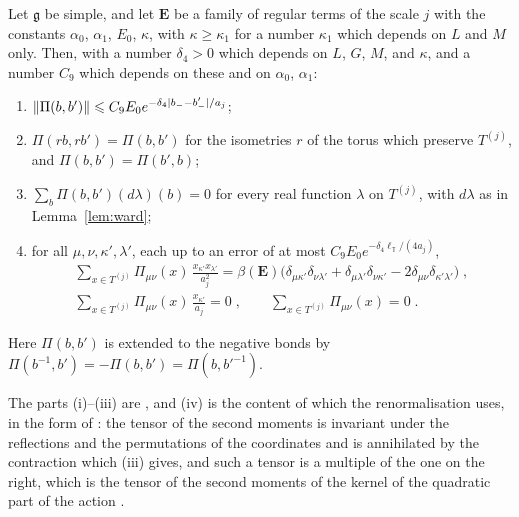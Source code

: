 \documentclass[11pt]{preprint}
\DeclarePairedDelimiter{\abs}{\lvert}{\rvert}
\DeclarePairedDelimiter{\norm}{\lVert}{\rVert}
\numberwithin{equation}{section}
\begin{document}
\begin{proposition}\label{prop:polarisation}
Let $\mathfrak g$ be simple, and let $\mathbf E$ be a family of regular terms of the scale $j$ with the constants $\alpha_0$, $\alpha_1$, $E_0$, $\kappa$, with $\kappa \geqslant \kappa_1$ for a number $\kappa_1$ which depends on $L$ and $M$ only. Then, with a number $\delta_4 > 0$ which depends on $L$, $G$, $M$, and $\kappa$, and a number $C_9$ which depends on these and on $\alpha_0$, $\alpha_1$:
\begin{enumerate}[label=(\roman*)]
\item $\norm{\Pi(b, b')} \leqslant C_9E_0e^{-\delta_4\abs{b_- - b'_-}/a_j}$;
\item $\Pi(rb, rb') = \Pi(b, b')$ for the isometries $r$ of the torus which preserve $T^{(j)}$, and $\Pi(b, b') = \Pi(b', b)$;
\item $\sum_b\Pi(b, b')(d\lambda)(b) = 0$ for every real function $\lambda$ on $T^{(j)}$, with $d\lambda$ as in Lemma~\ref{lem:ward};
\item for all $\mu, \nu, \kappa', \lambda'$, each up to an error of at most $C_9E_0e^{-\delta_4\ell_{\mathbb T}/(4a_j)}$,
\begin{equation}\label{eq:polarisation-moments}
\begin{gathered}
    \sum_{x \in T^{(j)}}\Pi_{\mu\nu}(x)\,\frac{x_{\kappa'}x_{\lambda'}}{a_j^2} = \beta(\mathbf E)\bigl(\delta_{\mu\kappa'}\delta_{\nu\lambda'} + \delta_{\mu\lambda'}\delta_{\nu\kappa'} - 2\delta_{\mu\nu}\delta_{\kappa'\lambda'}\bigr)\;,\\
    \sum_{x \in T^{(j)}}\Pi_{\mu\nu}(x)\,\frac{x_{\kappa'}}{a_j} = 0\;,
    \qquad
    \sum_{x \in T^{(j)}}\Pi_{\mu\nu}(x) = 0\;.
\end{gathered}
\end{equation}
\end{enumerate}
Here $\Pi(b, b')$ is extended to the negative bonds by $\Pi(b^{-1}, b') = -\Pi(b, b') = \Pi(b, b'^{-1})$.
\end{proposition}

The parts (i)--(iii) are \cite[(5.4)--(5.10), pp.~292--293]{BalabanRG1}, and (iv) is the content of \cite[(5.16)]{BalabanRG1} which the renormalisation uses, in the form of \cite[(3.60)--(3.64)]{BalabanCRE}: the tensor of the second moments is invariant under the reflections and the permutations of the coordinates and is annihilated by the contraction which (iii) gives, and such a tensor is a multiple of the one on the right, which is the tensor of the second moments of the kernel of the quadratic part of the action \cite[(4.41)--(4.43)]{BalabanRG1}.
\end{document}

